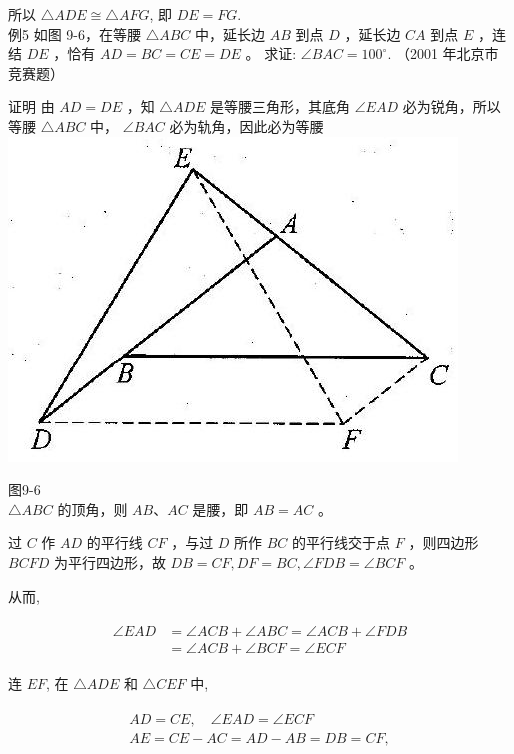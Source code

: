 \documentclass[10pt]{article}
\begin{document}
所以 $\triangle A D E \cong \triangle A F G$, 即 $D E=F G$.\\
例5 如图 9-6，在等腰 $\triangle A B C$ 中，延长边 $A B$ 到点 $D$ ，延长边 $C A$ 到点 $E$ ，连结 $D E$ ，恰有 $A D=B C=C E=D E$ 。 求证: $\angle B A C=100^{\circ}$. （2001 年北京市竞赛题）

证明 由 $A D=D E$ ，知 $\triangle A D E$ 是等腰三角形，其底角 $\angle E A D$ 必为锐角，所以等腰 $\triangle A B C$ 中， $\angle B A C$ 必为轨角，因此必为等腰\\
\includegraphics[max width=\textwidth, center]{2024_10_30_2c8f45efd4a519b08e1ag-092}

图9-6\\
$\triangle A B C$ 的顶角，则 $A B 、 A C$ 是腰，即 $A B=A C$ 。

过 $C$ 作 $A D$ 的平行线 $C F$ ，与过 $D$ 所作 $B C$ 的平行线交于点 $F$ ，则四边形 $B C F D$ 为平行四边形，故 $D B=C F, D F=B C, \angle F D B=\angle B C F$ 。

从而,

\begin{align*}
\begin{aligned}
\angle E A D & =\angle A C B+\angle A B C=\angle A C B+\angle F D B \\
& =\angle A C B+\angle B C F=\angle E C F
\end{aligned}
\end{align*}

连 $E F$, 在 $\triangle A D E$ 和 $\triangle C E F$ 中,

\begin{align*}
\begin{gathered}
A D=C E, \quad \angle E A D=\angle E C F \\
A E=C E-A C=A D-A B=D B=C F,
\end{gathered}
\end{align*}
\end{document}
